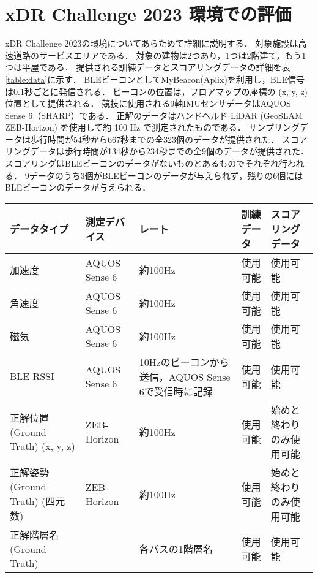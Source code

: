 
\section{xDR Challenge 2023 環境での評価}


xDR Challenge 2023の環境についてあらためて詳細に説明する．
対象施設は高速道路のサービスエリアである．
対象の建物は2つあり，1つは2階建て，もう1つは平屋である．
提供される訓練データとスコアリングデータの詳細を表\ref{table:data}に示す．
BLEビーコンとしてMyBeacon(Aplix)\cite{beacon-aplix}を利用し，BLE信号は0.1秒ごとに発信される．
ビーコンの位置は，フロアマップの座標の (x, y, z) 位置として提供される．
競技に使用される9軸IMUセンサデータはAQUOS Sense 6（SHARP）である．
正解のデータはハンドヘルド LiDAR (GeoSLAM ZEB-Horizon) を使用して約 100 Hz で測定されたものである．
サンプリングデータは歩行時間が54秒から667秒までの全323個のデータが提供された．
スコアリングデータは歩行時間が134秒から234秒までの全9個のデータが提供された．
スコアリングはBLEビーコンのデータがないものとあるものでそれぞれ行われる．
9データのうち3個がBLEビーコンのデータが与えられず，残りの6個にはBLEビーコンのデータが与えられる．


\begin{table*}[ht]
    \centering
    \caption{提供データの概要}
    \begin{tabularx}{\textwidth}{|X|l|X|l|l|}
        \hline
        データタイプ & 測定デバイス & レート & 訓練データ & スコアリングデータ \\ \hline
        加速度 & AQUOS Sense 6 & 約100Hz & 使用可能 & 使用可能 \\ \hline
        角速度 & AQUOS Sense 6 & 約100Hz & 使用可能 & 使用可能 \\ \hline
        磁気 & AQUOS Sense 6 & 約100Hz & 使用可能 & 使用可能 \\ \hline
        BLE RSSI & AQUOS Sense 6 & 10Hzのビーコンから送信，AQUOS Sense 6で受信時に記録 & 使用可能 & 使用可能 \\ \hline
        正解位置 (Ground Truth) (x, y, z) & ZEB-Horizon & 約100Hz & 使用可能 & 始めと終わりのみ使用可能 \\ \hline
        正解姿勢 (Ground Truth) (四元数) & ZEB-Horizon & 約100Hz & 使用可能 & 始めと終わりのみ使用可能 \\ \hline
        正解階層名 (Ground Truth) & - & 各パスの1階層名 & 使用可能 & 使用可能 \\ \hline
    \end{tabularx}
    \label{table:data}
\end{table*}



